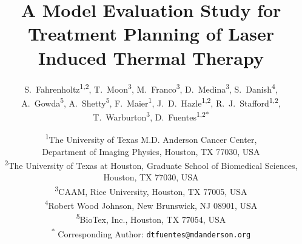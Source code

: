 \documentclass[12pt]{article}
\begin{document}
\title{\bf \Large
A Model Evaluation Study for Treatment Planning of Laser Induced Thermal Therapy
}

\author{ S.~Fahrenholtz\textsuperscript{1,2},
         T.~Moon\textsuperscript{3},
         M.~Franco\textsuperscript{3},
         D.~Medina\textsuperscript{3}, 
         S.~Danish\textsuperscript{4}, \\
         A.~Gowda\textsuperscript{5},
         A.~Shetty\textsuperscript{5},
         F.~Maier\textsuperscript{1},
         J.~D.~Hazle\textsuperscript{1,2},
         R.~J.~Stafford\textsuperscript{1,2}, \\
         T.~Warburton\textsuperscript{3},
         D.~Fuentes\textsuperscript{1,2*}
       }
\date{ \small
\textsuperscript{1}The University of Texas M.D. Anderson Cancer Center,\\
Department of Imaging Physics, Houston, TX 77030, USA \\
\textsuperscript{2}The University of Texas at Houston, Graduate School of Biomedical Sciences,\\
Houston, TX 77030, USA\\
\textsuperscript{3}CAAM, Rice University, Houston, TX 77005, USA\\ 
\textsuperscript{4}Robert Wood Johnson, New Brunswick, NJ 08901, USA \\
\textsuperscript{5}BioTex, Inc., Houston, TX 77054, USA \\
\textsuperscript{*} Corresponding Author: \texttt{dtfuentes@mdanderson.org}   \\
}


\maketitle

\end{document}
